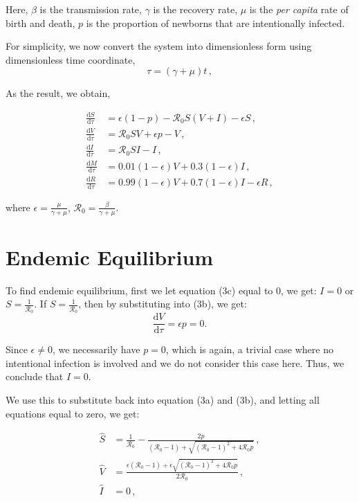 \documentclass[12pt]{article}
\newcommand\dbyd[2]{\frac{\mathrm d{#1}}{\mathrm d{#2}}}
\newcommand{\R}{\mathcal{R}}
\begin{document}
Here, $\beta$ is the transmission rate, $\gamma$ is the recovery rate,
$\mu$ is the \emph{per capita} rate of birth and death, $p$ is the
proportion of newborns that are intentionally infected.

For simplicity, we now convert the system into dimensionless form using dimensionless time coordinate,
\begin{equation}
\tau=(\gamma+\mu)t \,,
\end{equation}

As the result, we obtain,

\begin{subequations}\label{1}
\begin{align}
\dbyd{S}{\tau}&=\epsilon(1-p)- \R_0 S(V+I)-\epsilon S\,, \\
\dbyd{V}{\tau}&=\R_0 SV+\epsilon p-V\,,\\
\dbyd{I}{\tau}&=\R_0 SI-I\,,\\
\dbyd{M}{\tau}&=0.01(1-\epsilon) V+0.3(1-\epsilon) I\,,\\
\dbyd{R}{\tau}&=0.99(1-\epsilon) V+0.7(1-\epsilon) I-\epsilon R\,,
\end{align}
\end{subequations}

where $\epsilon=\frac{\mu}{\gamma+\mu}$, $\R_0=\frac{\beta}{\gamma+\mu}$.

\section{Endemic Equilibrium}

To find endemic equilibrium, first we let equation (3c) equal to 0, we get: $I=0$ or $S=\frac{1}{\R_0}$. If $S=\frac{1}{\R_0}$, then by substituting into (3b), we get:
\begin{equation}
\dbyd{V}{\tau}=\epsilon p = 0.
\end{equation}

Since $\epsilon\neq0$, we necessarily have $p=0$, which is again, a trivial case where no intentional infection is involved and we do not consider this case here. Thus, we conclude that $I=0$.

We use this to substitute back into equation (3a) and (3b), and letting all equations equal to zero, we get:

\begin{subequations}
\begin{align}
\hat{S}&= \frac{1}{\R_0}-\frac{2p}{(\R_0 -1)+ \sqrt{(\R_0-1)^2+4\R_0 p}}\,,\\
\hat{V}&= \frac{\epsilon(\R_0 -1)+ \epsilon \sqrt{(\R_0-1)^2+4\R_0 p}}{2\R_0}\,, \\
\hat{I}&=0\,,\\
\end{align}
\end{subequations}
\end{document}

